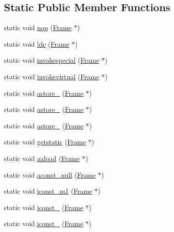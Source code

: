 \subsection*{Static Public Member Functions}
\begin{DoxyCompactItemize}
\item 
static void \hyperlink{class_instruction_impl_a167bb8f230879fe6470318755fa3bcc9}{nop} (\hyperlink{struct_frame}{Frame} $\ast$)
\item 
static void \hyperlink{class_instruction_impl_ade3ec2b9168ba2026599db6136e60d91}{ldc} (\hyperlink{struct_frame}{Frame} $\ast$)
\item 
static void \hyperlink{class_instruction_impl_ae794ec480c5cd8809d1215aa9442501b}{invokespecial} (\hyperlink{struct_frame}{Frame} $\ast$)
\item 
static void \hyperlink{class_instruction_impl_a3d197a31eaa6bc79b6d882b0ac9f1a67}{invokevirtual} (\hyperlink{struct_frame}{Frame} $\ast$)
\item 
static void \hyperlink{class_instruction_impl_a8e22c97b7a5408889fc672f53975739b}{astore\+\_} (\hyperlink{struct_frame}{Frame} $\ast$)
\item 
static void \hyperlink{class_instruction_impl_af75825b606faebaa31f5629712eabc8d}{astore\+\_} (\hyperlink{struct_frame}{Frame} $\ast$)
\item 
static void \hyperlink{class_instruction_impl_ab479b5925d755dd943dd86d054070dff}{astore\+\_} (\hyperlink{struct_frame}{Frame} $\ast$)
\item 
static void \hyperlink{class_instruction_impl_af10750df1ad4bf72ac80445dbbec068b}{getstatic} (\hyperlink{struct_frame}{Frame} $\ast$)
\item 
static void \hyperlink{class_instruction_impl_a3f4845ec999e7748deb58df324a71deb}{aaload} (\hyperlink{struct_frame}{Frame} $\ast$)
\item 
static void \hyperlink{class_instruction_impl_a9f1d9c6c5641f592c37652c38e47751d}{aconst\+\_\+null} (\hyperlink{struct_frame}{Frame} $\ast$)
\item 
static void \hyperlink{class_instruction_impl_ab36fd8503491518fcb80b92f7ee4003c}{iconst\+\_\+m1} (\hyperlink{struct_frame}{Frame} $\ast$)
\item 
static void \hyperlink{class_instruction_impl_a51eaef20621f31549bd84147ad484e10}{iconst\+\_} (\hyperlink{struct_frame}{Frame} $\ast$)
\item 
static void \hyperlink{class_instruction_impl_a78866e94cc43dba54dde53608cb18053}{iconst\+\_} (\hyperlink{struct_frame}{Frame} $\ast$)

\end{DoxyCompactItemize}
